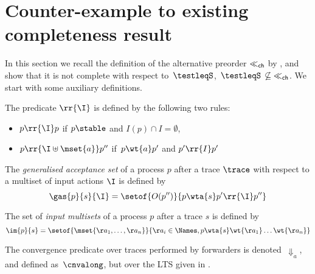 \section{Counter-example to existing completeness result}
\label{sec:counterexample}


\newcommand{\llch}{\ensuremath{\ll_{{\sf ch}}}}
\newcommand{\readyset}{\ensuremath{R}}
\renewcommand\acnvalong{\Downarrow_{a}}



In this section we recall the definition of the alternative
preorder $\llch$ by \cite{DBLP:conf/fsttcs/CastellaniH98},
and show that it is not complete with respect to~$\testleqS$,
\ie $\,\testleqS\, \not\subseteq\; \llch$.
  We start with some               
  auxiliary definitions.
\smallskip


The predicate $\rr{\I}$ is defined by the following two rules: %
\begin{itemize}
\item $ p \rr{\I} p$ if $p \stable$ and %
 $I(p) \cap I = \emptyset$,
\item $ p \rr{\I \uplus \mset{a}} p'' $ if $\,p \wt{a} p'$ and $ p' \rr{I} p'$
\end{itemize}
\smallskip

The {\em generalised acceptance set} of a process $p$ after a trace
$\trace$ with respect to a multiset of input actions $\I$ is defined by
$$
\gas{p}{s}{\I} = \setof{ O(p'') }{ p \wta{s} p' \rr{\I} p''}
$$

The set of {\em input
  multisets} of a process $p$ after a trace $s$ is defined by
$$\im{p}{s} = \setof{ \mset{\aa_1, \ldots,
    \aa_n } }{ \aa_i \in \Names, p \wta{s} \wt{\aa_1} \ldots
  \wt{\aa_n}}$$

\smallskip


The convergence predicate over traces performed by forwarders is
  denoted~$\acnvalong$, and defined as~$\cnvalong$, but over the LTS
  given in .

